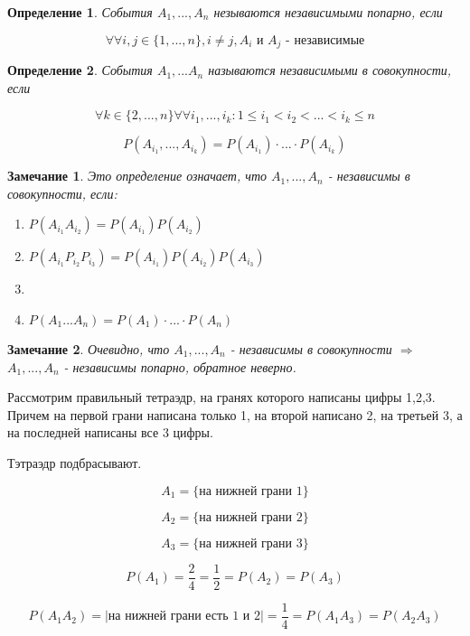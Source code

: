 \documentclass[a4paper, 14pt]{report}
\newtheorem{defenition}{Определение}[section]
\newtheorem{note}{Замечание}[section]
\begin{document}
\begin{defenition}
    События $A_1,...,A_n$ незываются независимыми попарно, если

    $$
    \forall \forall i,j \in \{1,...,n\},i \ne j, A_i \text{ и } A_j \text{ - независимые}
    $$
\end{defenition}

\begin{defenition}
    События $A_1,...A_n$ называются независимыми в совокупности, если

    $$
    \forall k \in \{2,...,n\} \forall \forall i_1,...,i_k : 1 \le i_1 < i_2 < ... < i_k \le n
    $$

    $$
    P(A_{i_1},...,A_{i_k}) = P(A_{i_1}) \cdot ... \cdot P(A_{i_k})
    $$
\end{defenition}

\begin{note}
    Это определение означает, что $A_1,...,A_n$ - независимы в совокупности, если:

    \begin{enumerate}
        \item $P(A_{i_1} A_{i_2}) = P(A_{i_1})P(A_{i_2})$
        \item $P(A_{i_1} P_{i_2} P_{i_3}) = P(A_{i_1})P(A_{i_2}) P(A_{i_3})$
        \item[...]
        \item[n-1.] $ P(A_1 ... A_n) = P(A_1) \cdot ... \cdot P(A_n) $
    \end{enumerate}
\end{note}

\begin{note}
    Очевидно, что $A_1,...,A_n$ - независимы в совокупности $\Rightarrow$ $A_1,...,A_n$ - независимы попарно, обратное неверно.
\end{note}

Рассмотрим правильный тетраэдр, на гранях которого написаны цифры 1,2,3. Причем на первой грани написана только 1, на второй написано 2, на третьей 3, а на последней написаны все 3 цифры.

Тэтраэдр подбрасывают.

$$
A_1 = \{ \text{на нижней грани 1} \}
$$

$$
A_2 = \{ \text{на нижней грани 2} \}
$$

$$
A_3 = \{ \text{на нижней грани 3} \}
$$

$$
P(A_1) = \frac{2}{4} = \frac{1}{2} = P(A_2) = P(A_3)
$$

$$
P(A_1A_2) = | \text{на нижней грани есть 1 и 2} | = \frac{1}{4} = P(A_1A_3) = P(A_2A_3)
$$
\end{document}
